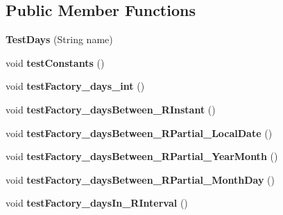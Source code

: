 \subsection*{Public Member Functions}
\begin{DoxyCompactItemize}
\item 
\hypertarget{classorg_1_1joda_1_1time_1_1_test_days_a7ac9869de5004d7c9f3475f9854bcb7e}{{\bfseries Test\-Days} (String name)}\label{classorg_1_1joda_1_1time_1_1_test_days_a7ac9869de5004d7c9f3475f9854bcb7e}

\item 
\hypertarget{classorg_1_1joda_1_1time_1_1_test_days_a18f509c66db2cfd3afcecc10883f8c2e}{void {\bfseries test\-Constants} ()}\label{classorg_1_1joda_1_1time_1_1_test_days_a18f509c66db2cfd3afcecc10883f8c2e}

\item 
\hypertarget{classorg_1_1joda_1_1time_1_1_test_days_a35c3737142d3087ba90a1556df717cf5}{void {\bfseries test\-Factory\-\_\-days\-\_\-int} ()}\label{classorg_1_1joda_1_1time_1_1_test_days_a35c3737142d3087ba90a1556df717cf5}

\item 
\hypertarget{classorg_1_1joda_1_1time_1_1_test_days_aa0e48f566fd79c1b852943993045ff34}{void {\bfseries test\-Factory\-\_\-days\-Between\-\_\-\-R\-Instant} ()}\label{classorg_1_1joda_1_1time_1_1_test_days_aa0e48f566fd79c1b852943993045ff34}

\item 
\hypertarget{classorg_1_1joda_1_1time_1_1_test_days_ada29b153e120468d15ac60773b0771cb}{void {\bfseries test\-Factory\-\_\-days\-Between\-\_\-\-R\-Partial\-\_\-\-Local\-Date} ()}\label{classorg_1_1joda_1_1time_1_1_test_days_ada29b153e120468d15ac60773b0771cb}

\item 
\hypertarget{classorg_1_1joda_1_1time_1_1_test_days_aa1438fd64b3a19d02aaa831968876df8}{void {\bfseries test\-Factory\-\_\-days\-Between\-\_\-\-R\-Partial\-\_\-\-Year\-Month} ()}\label{classorg_1_1joda_1_1time_1_1_test_days_aa1438fd64b3a19d02aaa831968876df8}

\item 
\hypertarget{classorg_1_1joda_1_1time_1_1_test_days_a3d9ac1583d64fffcb7c8c0d1304daf24}{void {\bfseries test\-Factory\-\_\-days\-Between\-\_\-\-R\-Partial\-\_\-\-Month\-Day} ()}\label{classorg_1_1joda_1_1time_1_1_test_days_a3d9ac1583d64fffcb7c8c0d1304daf24}

\item 
\hypertarget{classorg_1_1joda_1_1time_1_1_test_days_a4b8693f7d9f384748f0be10bd8176a1c}{void {\bfseries test\-Factory\-\_\-days\-In\-\_\-\-R\-Interval} ()}\label{classorg_1_1joda_1_1time_1_1_test_days_a4b8693f7d9f384748f0be10bd8176a1c}


\end{DoxyCompactItemize}
